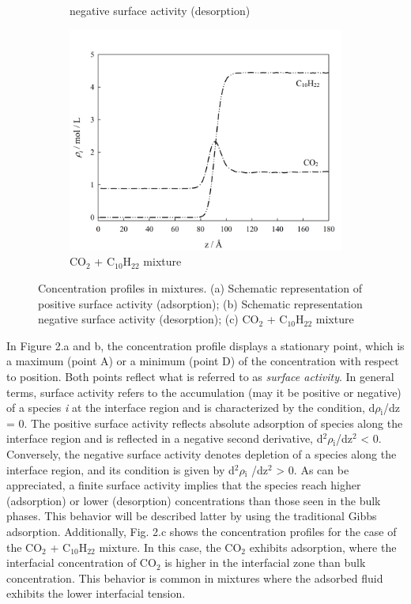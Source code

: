 \documentclass[9pt,bestpractices]{livecoms}
\begin{document}
\begin{figure}
\begin{subfigure}{0.2\textwidth}
		\caption{negative surface activity (desorption)} %
	\end{subfigure}
	\begin{subfigure}{0.4\textwidth} %
    \includegraphics[width=1\textwidth]{gfx/image4.png}
		\caption{CO$_{2}$ + C$_{10}$H$_{22}$ mixture} %
	\end{subfigure}
	\caption{Concentration profiles in mixtures. (a) Schematic representation of positive surface activity (adsorption); (b) Schematic representation negative surface activity (desorption); (c) CO$_{2}$ + C$_{10}$H$_{22}$ mixture} %
\end{figure}

In Figure 2.a and b, the concentration profile displays a stationary point,
which is a maximum (point A) or a minimum (point D) of the concentration with
respect to position. Both points reflect what is referred to as \textit{surface
activity}. In general terms, surface activity refers to the accumulation (may
it be positive or negative) of a species \textit{i} at the interface region and
is characterized by the condition, d${\rho}$$_{\mathrm{i}}$/dz = 0. The
positive surface activity reflects absolute adsorption of species along the
interface region and is reflected in a negative second derivative,
d$^{2}$${\rho}$$_{\mathrm{i}}$/dz$^{2}$ {\textless} 0. Conversely, the negative
surface activity denotes depletion of a species along the interface region, and
its condition is given by d$^{2}$${\rho}$$_{\mathrm{i}}$ /dz$^{2}$
{\textgreater} 0. As can be appreciated, a finite surface activity implies that
the species reach higher (adsorption) or lower (desorption) concentrations than
those seen in the bulk phases. This behavior will be described latter by using
the traditional Gibbs adsorption. Additionally, Fig. 2.c shows the
concentration profiles for the case of the CO$_{2}$ + C$_{10}$H$_{22}$ mixture.
In this case, the CO$_{2}$ exhibits adsorption, where the interfacial
concentration of CO$_{2}$ is higher in the interfacial zone than bulk
concentration. This behavior is common in mixtures where the adsorbed fluid
exhibits the lower interfacial tension.     
\end{document}

